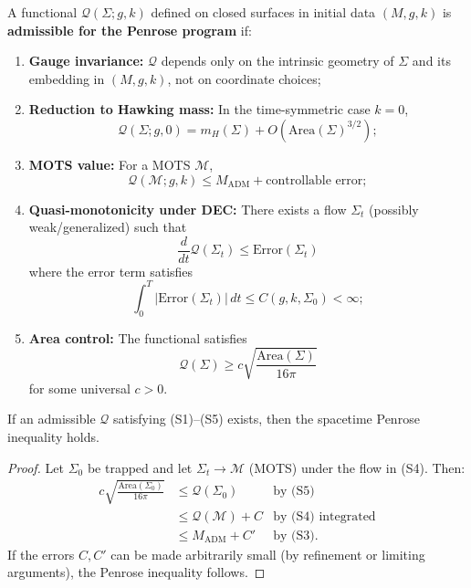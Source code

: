 \begin{definition}
\label{def:structural-constraints}
A functional $\mathcal{Q}(\Sigma; g, k)$ defined on closed surfaces in initial data $(M,g,k)$ is \textbf{admissible for the Penrose program} if:
\begin{enumerate}[label=\textbf{(S\arabic*)}]
\item \textbf{Gauge invariance:} $\mathcal{Q}$ depends only on the intrinsic geometry of $\Sigma$ and its embedding in $(M,g,k)$, not on coordinate choices;
\item \textbf{Reduction to Hawking mass:} In the time-symmetric case $k = 0$, 
\[
\mathcal{Q}(\Sigma; g, 0) = m_H(\Sigma) + O(\mathrm{Area}(\Sigma)^{3/2});
\]
\item \textbf{MOTS value:} For a MOTS $\mathcal{M}$,
\[
\mathcal{Q}(\mathcal{M}; g, k) \leq M_{\mathrm{ADM}} + \text{controllable error};
\]
\item \textbf{Quasi-monotonicity under DEC:} There exists a flow $\Sigma_t$ (possibly weak/generalized) such that
\[
\frac{d}{dt}\mathcal{Q}(\Sigma_t) \leq \text{Error}(\Sigma_t)
\]
where the error term satisfies
\[
\int_0^{T} |\text{Error}(\Sigma_t)| \, dt \leq C(g,k,\Sigma_0) < \infty;
\]
\item \textbf{Area control:} The functional satisfies
\[
\mathcal{Q}(\Sigma) \geq c \sqrt{\frac{\mathrm{Area}(\Sigma)}{16\pi}}
\]
for some universal $c > 0$.
\end{enumerate}
\end{definition}

\begin{proposition}
If an admissible $\mathcal{Q}$ satisfying (S1)--(S5) exists, then the spacetime Penrose inequality holds.
\end{proposition}

\begin{proof}
Let $\Sigma_0$ be trapped and let $\Sigma_t \to \mathcal{M}$ (MOTS) under the flow in (S4). Then:
\begin{align}
c\sqrt{\frac{\mathrm{Area}(\Sigma_0)}{16\pi}} &\leq \mathcal{Q}(\Sigma_0) & \text{by (S5)} \\
&\leq \mathcal{Q}(\mathcal{M}) + C & \text{by (S4) integrated} \\
&\leq M_{\mathrm{ADM}} + C' & \text{by (S3)}.
\end{align}
If the errors $C, C'$ can be made arbitrarily small (by refinement or limiting arguments), the Penrose inequality follows.
\end{proof}

